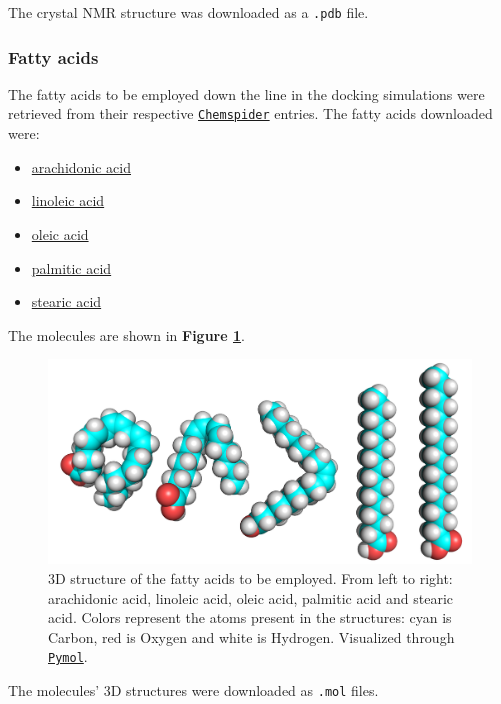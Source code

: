 The crystal NMR structure was downloaded as a \texttt{.pdb} file.

\subsubsection{Fatty acids}

The fatty acids to be employed down the line in the docking simulations were retrieved from their respective \href{https://www.chemspider.com/}{\texttt{Chemspider}} entries. The fatty acids downloaded were:

\begin{itemize}
    \item\href{https://www.chemspider.com/Chemical-Structure.392692.html}{arachidonic acid}
    \item\href{https://www.chemspider.com/Chemical-Structure.4444105.html}{linoleic acid}
    \item\href{https://www.chemspider.com/Chemical-Structure.393217.html}{oleic acid}
    \item\href{https://www.chemspider.com/Chemical-Structure.960.html}{palmitic acid}
    \item\href{https://www.chemspider.com/Chemical-Structure.5091.html}{stearic acid}
\end{itemize}

The molecules are shown in \textbf{Figure \ref{fig:fatty_acids}}.

\begin{figure}[htbp!]
    \centering
    \includegraphics[width=0.75\linewidth]{assets/fatty_acids.png}
    \caption{3D structure of the fatty acids to be employed. From left to right: arachidonic acid, linoleic acid, oleic acid, palmitic acid and stearic acid. Colors represent the atoms present in the structures: cyan is Carbon, red is Oxygen and white is Hydrogen. Visualized through \href{https://pymol.org/2/}{\texttt{Pymol}}.}
    \label{fig:fatty_acids}
\end{figure}

The molecules' 3D structures were downloaded as \texttt{.mol} files. 

